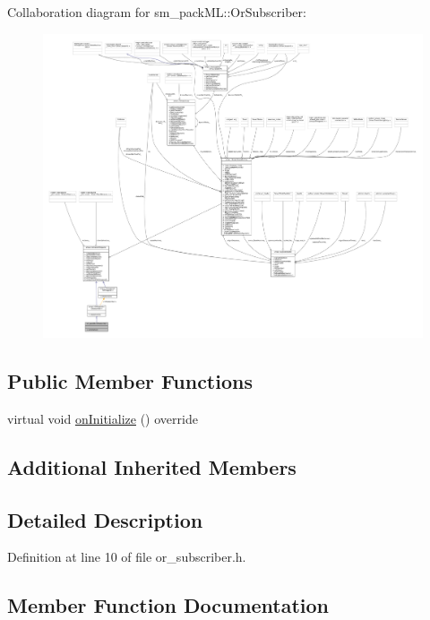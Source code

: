 Collaboration diagram for sm\+\_\+pack\+ML\+:\+:Or\+Subscriber\+:
\nopagebreak
\begin{figure}[H]
\begin{center}
\leavevmode
\includegraphics[width=350pt]{classsm__packML_1_1OrSubscriber__coll__graph}
\end{center}
\end{figure}
\subsection*{Public Member Functions}
\begin{DoxyCompactItemize}
\item 
virtual void \hyperlink{classsm__packML_1_1OrSubscriber_acdcffc7bb365710f8ab3a0f4aa0a8269}{on\+Initialize} () override
\end{DoxyCompactItemize}
\subsection*{Additional Inherited Members}


\subsection{Detailed Description}


Definition at line 10 of file or\+\_\+subscriber.\+h.



\subsection{Member Function Documentation}
\mbox{\label{classsm__packML_1_1OrSubscriber_acdcffc7bb365710f8ab3a0f4aa0a8269}} 
